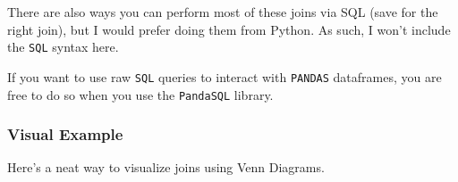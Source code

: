 \documentclass[english, 10pt]{article}
\begin{document}
There are also ways you can perform most of these joins via SQL (save for the right join), but I would prefer doing them from Python. As such, I won't include the \texttt{SQL} syntax here.

\hfill \break
\begin{tcolorbox}[title=Aside: Raw \texttt{SQL} with Pandas,colframe=black,colback=white,arc=0pt,fonttitle=\bfseries]
If you want to use raw \texttt{SQL} queries to interact with \texttt{PANDAS} dataframes, you are free to do so when you use the \texttt{PandaSQL} library.
\end{tcolorbox}

\subsubsection{Visual Example}

Here's a neat way to visualize joins using Venn Diagrams.\\\\
\end{document}
